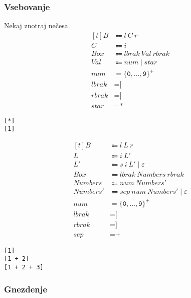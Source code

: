 \documentclass{report}
\newcommand{\Null}{\varepsilon}
\newcommand{\Char}[1]{\texttt{#1}}
\newcommand{\Spc}{\ }
\newcommand{\Union}{\mathrel{|}}
\newcommand{\KleenePlus}[1]{#1^+}
\newcommand{\Arrow}{\Coloneq}
\newcommand{\NT}[1]{{#1}}
\newcommand{\T}[1]{{#1}}
\begin{document}
\subsubsection{Vsebovanje}
Nekaj znotraj nečesa.
\begin{equation*}
  \begin{aligned}[t]
    \NT{B} &\Arrow \T{l} \Spc \T{C} \Spc \T{r}\\
    \NT{C} &\Arrow \T{i}\\[1em]
    \NT{Box} &\Arrow \T{lbrak} \Spc \NT{Val} \Spc \T{rbrak}\\
    \NT{Val} &\Arrow \T{num} \Union \T{star}\\[1em]
    \T{num} &= \KleenePlus{\{\Char{0}, \dots, \Char{9}\}}\\
    \T{lbrak} &= \Char{[}\\
    \T{rbrak} &= \Char{]}\\
    \T{star} &= \Char{*}
  \end{aligned}
\end{equation*}
\begin{lstlisting}
[*]
[1]
\end{lstlisting}

\begin{equation*}
  \begin{aligned}[t]
    \NT{B} &\Arrow \T{l} \Spc \T{L} \Spc \T{r}\\
    \NT{L} &\Arrow \T{i} \Spc \NT{L'}\\
    \NT{L'} &\Arrow \T{s} \Spc \T{i} \Spc \NT{L'} \Union \Null\\[1em]
    \NT{Box} &\Arrow \T{lbrak} \Spc \NT{Numbers} \Spc \T{rbrak}\\
    \NT{Numbers} &\Arrow \T{num} \Spc \NT{Numbers'}\\
    \NT{Numbers'} &\Arrow \T{sep} \Spc \T{num} \Spc \NT{Numbers'} \Union \Null\\[1em]
    \T{num} &= \KleenePlus{\{\Char{0}, \dots, \Char{9}\}}\\
    \T{lbrak} &= \Char{[}\\
    \T{rbrak} &= \Char{]}\\
    \T{sep} &= \Char{+}
  \end{aligned}
\end{equation*}
\begin{lstlisting}
[1]
[1 + 2]
[1 + 2 + 3]
\end{lstlisting}

\subsubsection{Gnezdenje}
\end{document}
